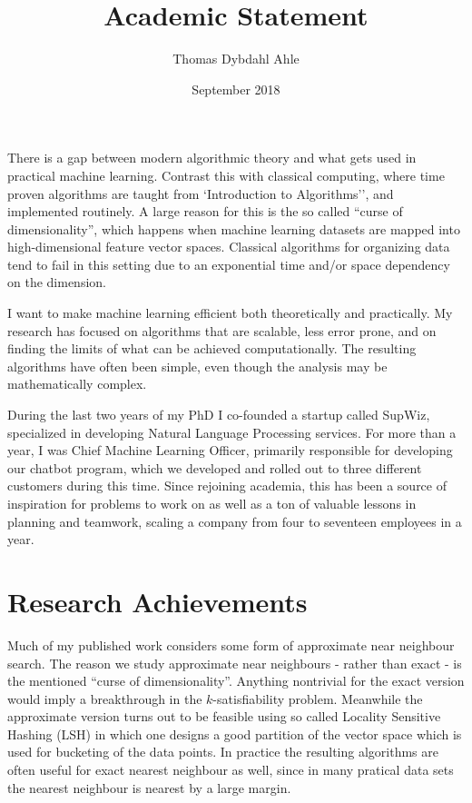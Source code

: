 \documentclass[10pt]{article}
\title{Academic Statement}
\author{Thomas Dybdahl Ahle}
\date{September 2018}
\begin{document}
\maketitle

There is a gap between modern algorithmic theory and what gets used in practical machine learning.
Contrast this with classical computing, where time proven algorithms are taught from `Introduction to Algorithms'', and implemented routinely.
A large reason for this is the so called ``curse of dimensionality'', which happens when machine learning datasets are mapped into high-dimensional feature vector spaces.
Classical algorithms for organizing data tend to fail in this setting due to an exponential time and/or space dependency on the dimension.

I want to make machine learning efficient both theoretically and practically.
My research has focused on algorithms that are scalable, less error prone, and on finding the limits of what can be achieved computationally.
The resulting algorithms have often been simple, even though the analysis may be mathematically complex.

During the last two years of my PhD I co-founded a startup called SupWiz, specialized in developing Natural Language Processing services.
For more than a year, I was Chief Machine Learning Officer, primarily responsible for developing our chatbot program, which we developed and rolled out to three different customers during this time.
Since rejoining academia, this has been a source of inspiration for problems to work on as well as a ton of valuable lessons in planning and teamwork, scaling a company from four to seventeen employees in a year.

\section{Research Achievements}

Much of my published work considers some form of approximate near neighbour search.
The reason we study approximate near neighbours - rather than exact - is the mentioned “curse of dimensionality”.
Anything nontrivial for the exact version would imply a breakthrough in the $k$-satisfiability problem.
Meanwhile the approximate version turns out to be feasible using so called Locality Sensitive Hashing (LSH) in which one designs a good partition of the vector space which is used for bucketing of the data points.
In practice the resulting algorithms are often useful for exact nearest neighbour as well, since in many pratical data sets the nearest neighbour is nearest by a large margin.
\end{document}
